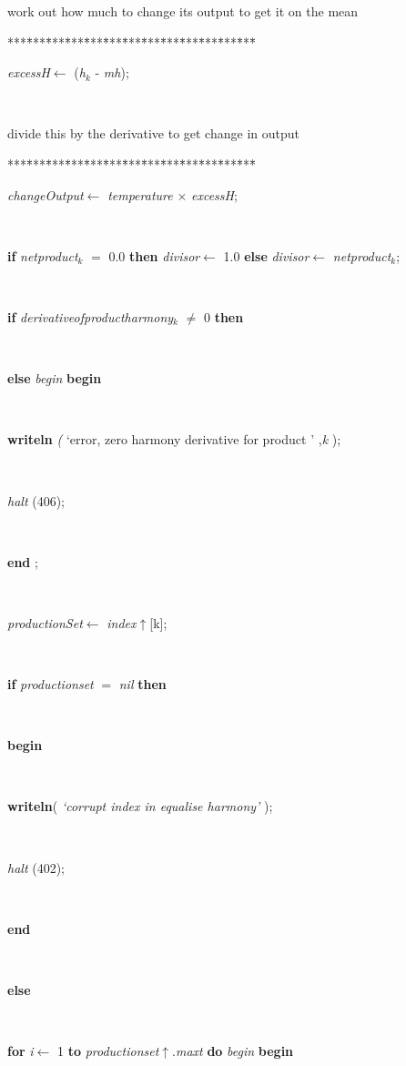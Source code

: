 work out how much to change its output to get it on the mean
\begin{tabbing}
***\=***\=***\=***\=***\=***\=***\=***\=***\=***\=***\=***\=***\=\kill
\+ \+ \+ \+ \\
\parbox{14cm}{\textsf{\textit{excessH}$\leftarrow$ (\textit{h}$_{\textit{k}}$ - \textit{mh})}; }\\
\end{tabbing}
divide this by the derivative to get change in output
\begin{tabbing}
***\=***\=***\=***\=***\=***\=***\=***\=***\=***\=***\=***\=***\=\kill
\+ \+ \+ \+ \\
\parbox{14cm}{\textsf{\textit{changeOutput}$\leftarrow$ \textit{temperature} $\times$ \textit{excessH}}; }\\
\parbox{14cm}{\textsf {\textbf {if } \textsf{\textit{netproduct}$_{\textit{k}}$ $=$ 0.0} \textbf{ then } \textsf{\textit{divisor}$\leftarrow$ 1.0} \textbf{ else } \textsf{\textit{divisor}$\leftarrow$ \textit{netproduct}$_{\textit{k}}$}; }}\\
\+\parbox{14cm}{\textsf {\textbf {if } \textsf{\textit{derivativeofproductharmony}$_{\textit{k}}$ $\neq$ 0} \textbf{ then } }}\\
\<\<\parbox{14cm}{\textsf {\textbf {else } \textsf{\textit{begin}} \textbf{ begin } }}\\
\parbox{14cm}{\textsf{\textbf{writeln} \textit{(} \textrm{\textup { `error, zero harmony derivative for product ' } },\textit{k} );}}\\
\parbox{14cm}{\textsf{\textit{halt} (406)}; }\\
\<\-\parbox{14cm}{\textsf{\textbf{end} ;}}\\
\parbox{14cm}{\textsf{\textit{productionSet}$\leftarrow$ \textit{index}$\uparrow$\textit{}[k]}; }\\
\+\parbox{14cm}{\textsf {\textbf {if } \textsf{\textit{productionset} $=$ \textit{nil}} \textbf{ then } }}\\
\<\parbox{14cm}{\textsf{\textbf{begin} }}\\
\parbox{14cm}{\textsf{\textbf{writeln}(\textit{\textrm{\textup { `corrupt index in equalise harmony' } }})}; }\\
\parbox{14cm}{\textsf{\textit{halt} (402)}; }\\
\<\-\parbox{14cm}{\textsf{\textbf{end} }}\\
\+\parbox{14cm}{\textsf{\textbf{else} }}\\
\+\<\parbox{14cm}{\textsf {\textbf {for } \textsf{\textit{i}$\leftarrow$ 1} \textbf{ to } \textsf{\textit{productionset}$\uparrow$.\textit{maxt}} \textbf{ do } \textsf{\textit{begin}} \textbf{ begin } }}\\

\end{tabbing}
